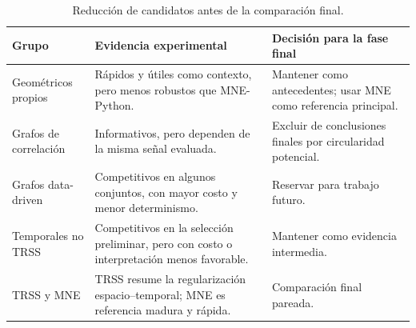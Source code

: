 \begin{table}[H]
\centering
\scriptsize
\setlength{\tabcolsep}{3pt}
\caption{Reducción de candidatos antes de la comparación final.}
\label{tab:ch4_candidate_reduction_decisions}
\begin{tabular}{@{}p{2.9cm}p{4.1cm}p{4.0cm}@{}}
\toprule
Grupo & Evidencia experimental & Decisión para la fase final \\
\midrule
Geométricos propios & Rápidos y útiles como contexto, pero menos robustos que MNE-Python. & Mantener como antecedentes; usar MNE como referencia principal. \\
Grafos de correlación & Informativos, pero dependen de la misma señal evaluada. & Excluir de conclusiones finales por circularidad potencial. \\
Grafos data-driven & Competitivos en algunos conjuntos, con mayor costo y menor determinismo. & Reservar para trabajo futuro. \\
Temporales no TRSS & Competitivos en la selección preliminar, pero con costo o interpretación menos favorable. & Mantener como evidencia intermedia. \\
TRSS y MNE & TRSS resume la regularización espacio--temporal; MNE es referencia madura y rápida. & Comparación final pareada. \\
\bottomrule
\end{tabular}
\end{table}
